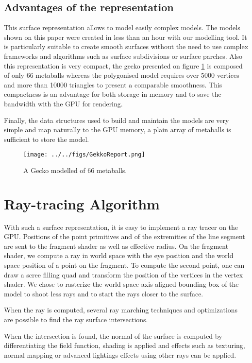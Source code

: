 \documentclass[annual]{acmsiggraph}
\begin{document}
\subsection{Advantages of the representation}

This surface representation allows to model easily complex models. The models shown on this paper were created in less than an hour with our modelling tool. It is particularly suitable to create smooth surfaces without the need to use complex frameworks and algorithms such as surface subdivisions or surface parches. Also this representation is very compact, the gecko presented on figure \ref{Gekko} is composed of only 66 metaballs whereas the polygonised model requires over 5000 vertices and more than 10000 triangles to present a comparable smoothness. This compactness is an advantage for both storage in memory and to save the bandwidth with the GPU for rendering.

Finally, the data structures used to build and maintain the models are very simple and map naturally to the GPU memory, a plain array of metaballs is sufficient to store the model. 

\begin{figure}[ht]
  \centering
  \texttt{[image: ../../figs/GekkoReport.png]}
  \caption{A Gecko modelled of 66 metaballs.}
  \label{Gekko}
\end{figure}

\section{Ray-tracing Algorithm}

With such a surface representation, it is easy to implement a ray tracer on the GPU. Positions of the point primitives and of the extremities of the line segment are sent to the fragment shader as well as effective radius. On the fragment shader, we compute a ray in world space with the eye position and the world space position of a point on the fragment. To compute the second point, one can draw a scree filling quad and transform the position of the vertices in the vertex shader. We chose to rasterize the world space axis aligned bounding box of the model to shoot less rays and to start the rays closer to the surface.

When the ray is computed, several ray marching techniques and optimizations are possible to find the ray surface intersections.

When the intersection is found, the normal of the surface is computed by differentiating the field function, shading is applied and effects such as texturing, normal mapping or advanced lightings effects using other rays can be applied.
\end{document}

